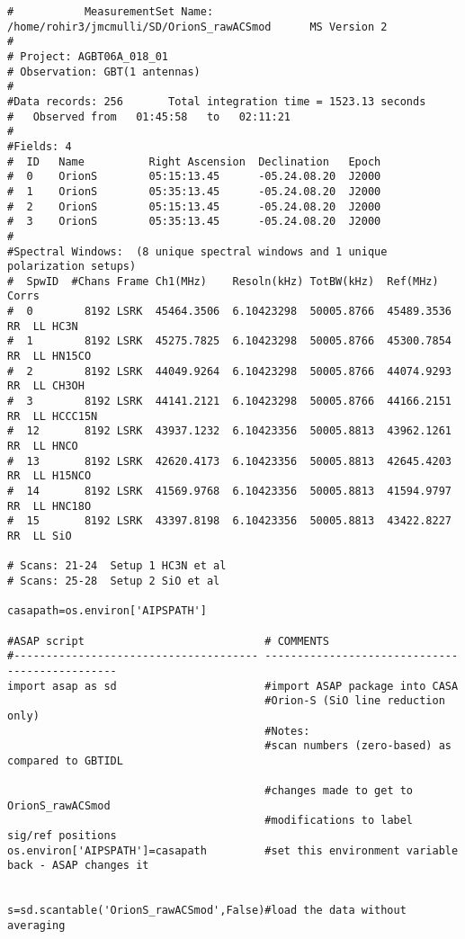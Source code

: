 \small
\begin{verbatim}
#           MeasurementSet Name:  /home/rohir3/jmcmulli/SD/OrionS_rawACSmod      MS Version 2
#
# Project: AGBT06A_018_01
# Observation: GBT(1 antennas)
#
#Data records: 256       Total integration time = 1523.13 seconds
#   Observed from   01:45:58   to   02:11:21
#
#Fields: 4
#  ID   Name          Right Ascension  Declination   Epoch
#  0    OrionS        05:15:13.45      -05.24.08.20  J2000
#  1    OrionS        05:35:13.45      -05.24.08.20  J2000
#  2    OrionS        05:15:13.45      -05.24.08.20  J2000
#  3    OrionS        05:35:13.45      -05.24.08.20  J2000
#
#Spectral Windows:  (8 unique spectral windows and 1 unique polarization setups)
#  SpwID  #Chans Frame Ch1(MHz)    Resoln(kHz) TotBW(kHz)  Ref(MHz)    Corrs
#  0        8192 LSRK  45464.3506  6.10423298  50005.8766  45489.3536  RR  LL HC3N
#  1        8192 LSRK  45275.7825  6.10423298  50005.8766  45300.7854  RR  LL HN15CO
#  2        8192 LSRK  44049.9264  6.10423298  50005.8766  44074.9293  RR  LL CH3OH
#  3        8192 LSRK  44141.2121  6.10423298  50005.8766  44166.2151  RR  LL HCCC15N
#  12       8192 LSRK  43937.1232  6.10423356  50005.8813  43962.1261  RR  LL HNCO
#  13       8192 LSRK  42620.4173  6.10423356  50005.8813  42645.4203  RR  LL H15NCO
#  14       8192 LSRK  41569.9768  6.10423356  50005.8813  41594.9797  RR  LL HNC18O
#  15       8192 LSRK  43397.8198  6.10423356  50005.8813  43422.8227  RR  LL SiO

# Scans: 21-24  Setup 1 HC3N et al
# Scans: 25-28  Setup 2 SiO et al

casapath=os.environ['AIPSPATH']

#ASAP script                            # COMMENTS                                      
#-------------------------------------- ----------------------------------------------- 
import asap as sd                       #import ASAP package into CASA                  
                                        #Orion-S (SiO line reduction only)
                                        #Notes:
                                        #scan numbers (zero-based) as compared to GBTIDL

                                        #changes made to get to OrionS_rawACSmod
                                        #modifications to label sig/ref positions
os.environ['AIPSPATH']=casapath         #set this environment variable back - ASAP changes it


s=sd.scantable('OrionS_rawACSmod',False)#load the data without averaging                
\end{verbatim}
\normalsize

